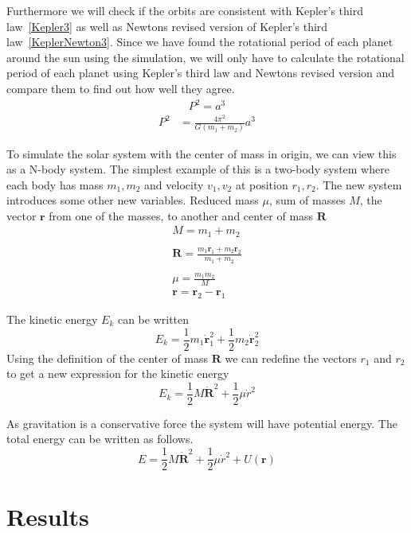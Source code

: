 \documentclass[reprint,english,notitlepage]{revtex4-2}
\begin{document}
Furthermore we will check if the orbits are consistent with Kepler's third law~\eqref{Kepler3} as well as Newtons revised version of Kepler's third law~\eqref{KeplerNewton3}.
Since we have found the rotational period of each planet around the sun using the simulation, we will only have to calculate the rotational period of each planet using Kepler's third law and Newtons revised version and compare them to find out how well they agree.
\begin{align}
    P^2 = a^3 \label{Kepler3}
\end{align}
\begin{align}
	P^2 &= \frac{4 \pi^2}{G \left( m_1 + m_2 \right)} a^3 \label{KeplerNewton3}
\end{align}

To simulate the solar system with the center of mass in origin, we can view this as a N-body system. The simplest example of this is a two-body system where each body has mass $ m_1 , m_2 $ and velocity $ v_1, v_2 $ at position $ r_1, r_2 $. The new system introduces some other new variables. Reduced mass $ \mu $, sum of masses $ M $, the vector $ \mathbf{r} $ from one of the masses, to another and center of mass $ \mathbf{R} $
\begin{align*}
	M = m_1 + m_2 \\ \\
	\mathbf{R} = \frac{m_1 \mathbf{r}_1 + m_2  \mathbf{r}_2}{m_1 + m_2} \\ \\
	\mu = \frac{m_1 m_2}{M} \\
	\mathbf{r} = \mathbf{r}_2 - \mathbf{r}_1
\end{align*}

The kinetic energy $ E_k $ can be written
\[
E_k = \frac{1}{2}m_1 \mathbf{\dot{r}}_{1}^{2} + \frac{1}{2}m_2 \mathbf{\dot{r}}_{2}^{2}
\]
Using the definition of the center of mass $ \mathbf{R} $ we can redefine the vectors $ r_1 $ and $ r_2 $ to get a new expression for the kinetic energy
\[
E_k = \frac{1}{2}M \mathbf{\dot{R}}^{2} + \frac{1}{2}μ \dot{r}^{2}
\]

As gravitation is a conservative force the system will have potential energy. The total energy can be written as follows.
\[
E = \frac{1}{2}M \mathbf{\dot{R}}^{2} + \frac{1}{2}μ \dot{r}^{2} + U(\mathbf{r})
\]


\section{Results}
\end{document}
